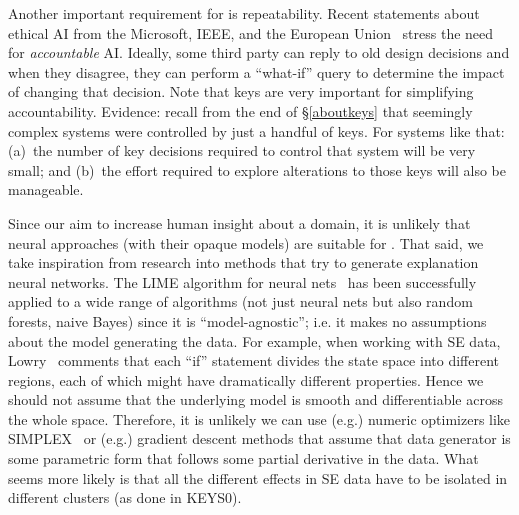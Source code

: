 Another important requirement for {\IT} is repeatability.
Recent statements about ethical AI from the
Microsoft, IEEE, and the European Union~\cite{EU, MicrosoftEthics, IEEEethics} stress the need for
{\em accountable} AI. Ideally, some third party can reply to old design decisions and when they disagree, they can perform a ``what-if''
query to determine the impact of changing that decision.
Note that keys are very important for simplifying  accountability.
Evidence: recall
from the end of \S\ref{aboutkeys} that seemingly complex systems were controlled
by just a handful of keys. For systems like that: (a)~the number of
key decisions required to control that system will be very small; and
(b)~the effort required to explore alterations to those keys will also be manageable.

 Since our aim  to increase human insight
 about a domain, it is unlikely that neural approaches
 (with their opaque models) are suitable for {\IT}.
That said, we take inspiration from research into
methods that try to  generate
explanation   neural networks. The LIME algorithm for neural nets~\cite{AIFLIME}
has been   successfully applied to 
a wide range of algorithms (not just neural nets
but also   random forests, naive Bayes)
since it is ``model-agnostic''; i.e. it makes no
assumptions about the model generating the data.
For example, when working with SE data,
Lowry~\cite{lowry98} comments that each ``if'' statement divides
the state space into different regions, each of which
might have dramatically different properties.
Hence we should not assume that the 
underlying model is smooth and differentiable
across the whole space. Therefore, it is unlikely we can use
(e.g.) numeric optimizers like SIMPLEX~\cite{nelder1965simplex} or 
(e.g.) gradient
descent methods that assume that data generator
is some parametric form that follows some
partial derivative in the data. What seems more likely is that all the different effects in SE data have to be isolated in different clusters (as done in KEYS0).





